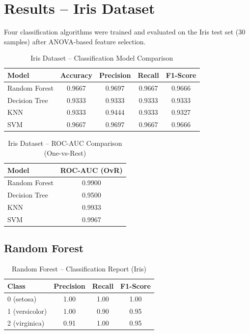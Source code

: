 \documentclass[12pt,a4paper]{article}
\begin{document}
\section{Results -- Iris Dataset}

Four classification algorithms were trained and evaluated on the Iris test set (30 samples) after ANOVA-based feature selection.

\begin{table}[H]
\centering
\begin{tabular}{lcccc}
\toprule
Model & Accuracy & Precision & Recall & F1-Score \\
\midrule
Random Forest & 0.9667 & 0.9697 & 0.9667 & 0.9666 \\
Decision Tree & 0.9333 & 0.9333 & 0.9333 & 0.9333 \\
KNN & 0.9333 & 0.9444 & 0.9333 & 0.9327 \\
SVM & 0.9667 & 0.9697 & 0.9667 & 0.9666 \\
\bottomrule
\end{tabular}
\caption{Iris Dataset -- Classification Model Comparison}
\end{table}

\begin{table}[H]
\centering
\begin{tabular}{lc}
\toprule
Model & ROC-AUC (OvR) \\
\midrule
Random Forest & 0.9900 \\
Decision Tree & 0.9500 \\
KNN & 0.9933 \\
SVM & 0.9967 \\
\bottomrule
\end{tabular}
\caption{Iris Dataset -- ROC-AUC Comparison (One-vs-Rest)}
\end{table}

\subsection*{Random Forest}

\begin{table}[H]
\centering
\begin{tabular}{lccc}
\toprule
Class & Precision & Recall & F1-Score \\
\midrule
0 (setosa) & 1.00 & 1.00 & 1.00 \\
1 (versicolor) & 1.00 & 0.90 & 0.95 \\
2 (virginica) & 0.91 & 1.00 & 0.95 \\
\bottomrule
\end{tabular}
\caption{Random Forest -- Classification Report (Iris)}
\end{table}
\end{document}
